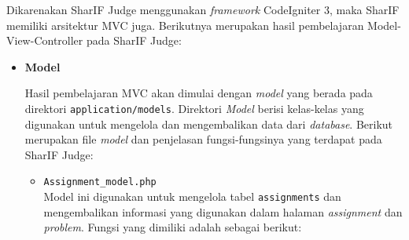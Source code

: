 \documentclass[a4paper,twoside]{article}
\begin{document}
\begin{enumerate}
\begin{itemize}
	      \end{itemize}

	      Dikarenakan SharIF Judge menggunakan \textit{framework} CodeIgniter 3, maka SharIF memiliki arsitektur MVC juga. Berikutnya merupakan hasil pembelajaran Model-View-Controller pada SharIF Judge:

	      \begin{itemize}
		      \item \textbf{Model}
		            \label{sub:3:1:1:model}

		            Hasil pembelajaran MVC akan dimulai dengan \textit{model} yang berada pada direktori \verb|application/models|. Direktori \textit{Model} berisi kelas-kelas yang digunakan untuk mengelola dan mengembalikan data dari \textit{database}. Berikut merupakan file \textit{model} dan penjelasan fungsi-fungsinya yang terdapat pada SharIF Judge:

		            \begin{itemize}
			            \item \verb|Assignment_model.php| \\
			                  Model ini digunakan untuk mengelola tabel \verb|assignments| dan mengembalikan informasi yang digunakan dalam halaman \textit{assignment} dan \textit{problem}. Fungsi yang dimiliki adalah sebagai berikut:


\end{itemize}
\end{itemize}
\end{enumerate}
\end{document}
